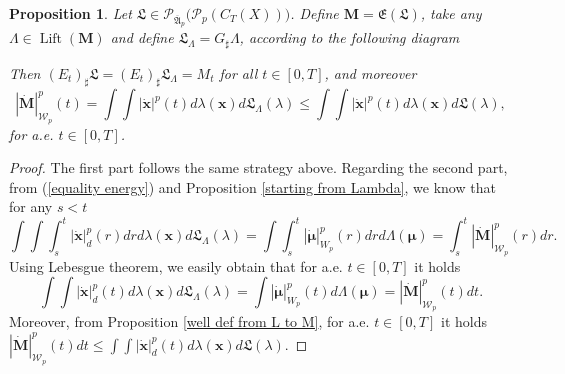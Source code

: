 \documentclass[10pt,leqno]{amsart}
\numberwithin{equation}{section}
\newtheorem{prop}[teorema]{Proposition}
\newcommand{\PP}{\mathcal{P}}
\begin{document}
\begin{prop}\label{3.10}
    Let $\mathfrak{L} \in \PP_{\overline{\mathfrak{A}}_p}\big(\PP_p(C_T(X))\big)$. Define $\boldsymbol{M} = \mathfrak{E}(\mathfrak{L})$, take any $\Lambda \in \operatorname{Lift}(\boldsymbol{M})$ and define $\mathfrak{L}_{\Lambda} = G_\sharp  \Lambda$, according to the following diagram
\begin{center}
    \color{black}
    \normalcolor
    \end{center}
    Then $(E_t)_\sharp \mathfrak{L} = (E_t)_\sharp \mathfrak{L}_{\Lambda} = M_t$ for all $t\in [0,T]$, and moreover
    \begin{equation}
        |\dot{\boldsymbol{M}}|_{\mathcal{W}_p}^p(t) = \int \int |\dot{\boldsymbol{x}}|^p(t)d\lambda(\boldsymbol{x}) d\mathfrak{L}_\Lambda(\lambda) \leq  \int \int |\dot{\boldsymbol{x}}|^p(t) d\lambda(\boldsymbol{x}) d\mathfrak{L}(\lambda),
    \end{equation}
    for a.e. $t\in [0,T]$.
\end{prop}

\begin{proof}
    The first part follows the same strategy above. Regarding the second part, from (\ref{equality energy}) and Proposition \ref{starting from Lambda}, we know that for any $s<t$
    \[\int \int \int_s^t |\dot{\boldsymbol{x}}|_d^p(r) dr d\lambda(\boldsymbol{x}) d\mathfrak{L}_\Lambda(\lambda) = \int \int_s^t |\dot{\boldsymbol{\mu}}|_{W_{p}}^p(r)drd\Lambda(\boldsymbol{\mu}) = \int_s^t |\dot{\boldsymbol{M}}|_{\mathcal{W}_p}^p(r) dr.\]
    Using Lebesgue theorem, we easily obtain that for a.e. $t\in [0,T]$ it holds 
    \[\int \int  |\dot{\boldsymbol{x}}|_d^p(t) d\lambda(\boldsymbol{x}) d\mathfrak{L}_\Lambda(\lambda) = \int |\dot{\boldsymbol{\mu}}|_{W_{p}}^p(t)d\Lambda(\boldsymbol{\mu}) =  |\dot{\boldsymbol{M}}|_{\mathcal{W}_p}^p(t) dt.\]
    Moreover, from Proposition \ref{well def from L to M}, for a.e. $t\in [0,T]$ it holds
    $ |\dot{\boldsymbol{M}}|_{\mathcal{W}_p}^p(t) dt \leq \int \int |\dot{\boldsymbol{x}}|_d^p(t) d\lambda(\boldsymbol{x}) d\mathfrak{L}(\lambda).$
\end{proof}
\end{document}
